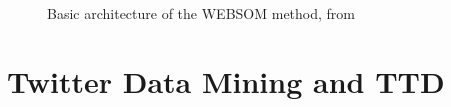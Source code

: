 \begin{figure}[htpb]
  \\
  \caption{Basic architecture of the WEBSOM method, from~\cite{honkelawebsom}}
  \label{fig:websom}
\end{figure}

\section{Twitter Data Mining and TTD} 
\label{sec:data_mining_in_twitter_}

